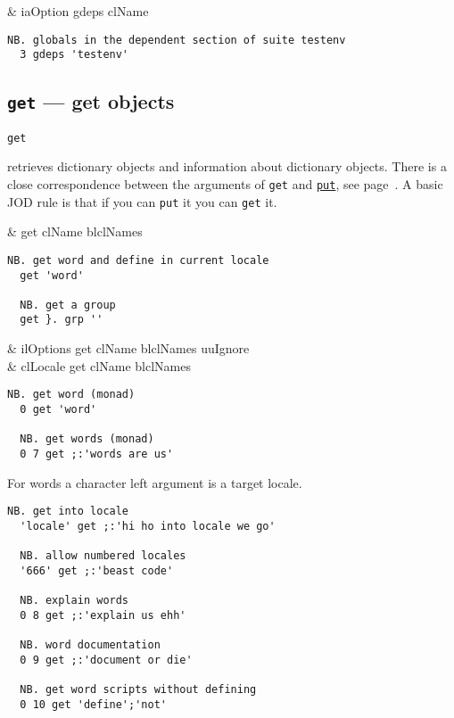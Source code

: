 \begin{wordhead}
\dyad & iaOption gdeps clName \\
\end{wordhead}
\begin{lstlisting}[frame=single,framerule=0pt]
  NB. globals in the dependent section of suite testenv
  3 gdeps 'testenv'  
\end{lstlisting}

\subsection{\texttt{get} --- get objects}\label{ss:get}

\hypertarget{il:get}{\texttt{get}} retrieves dictionary objects and information 
about dictionary objects. 
There is a close correspondence between the arguments of \texttt{get} 
and \hyperlink{il:put}{\texttt{put}}, see page~\pageref{ss:put}. 
A basic JOD rule is that if you can \texttt{put} it you can \texttt{get} it.

\begin{wordhead}
\monad & get clName \argsep blclNames \\
\end{wordhead}
\begin{lstlisting}[frame=single,framerule=0pt]
  NB. get word and define in current locale
  get 'word'  
  
  NB. get a group  
  get }. grp '' 
\end{lstlisting}

\begin{wordhead}
\dyad & ilOptions get clName \argsep blclNames \argsep uuIgnore \\
      & clLocale get clName \argsep blclNames \\
\end{wordhead}
\begin{lstlisting}[frame=single,framerule=0pt]
  NB. get word (monad)
  0 get 'word'  
  
  NB. get words (monad) 
  0 7 get ;:'words are us' 
\end{lstlisting} 

  For words a character left argument is a target locale.
  
\begin{lstlisting}[frame=single,framerule=0pt]  
  NB. get into locale
  'locale' get ;:'hi ho into locale we go'  
  
  NB. allow numbered locales
  '666' get ;:'beast code'  
    
  NB. explain words
  0 8 get ;:'explain us ehh'  
  
  NB. word documentation
  0 9 get ;:'document or die' 
  
  NB. get word scripts without defining 
  0 10 get 'define';'not' 
\end{lstlisting} 
    
